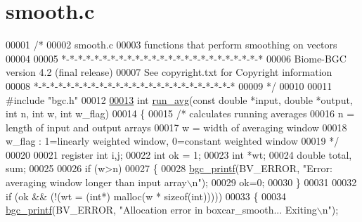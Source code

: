 \hypertarget{smooth_8c_source}{}\section{smooth.\+c}
\label{smooth_8c_source}

\begin{DoxyCode}
00001 \textcolor{comment}{/* }
00002 \textcolor{comment}{smooth.c}
00003 \textcolor{comment}{functions that perform smoothing on vectors}
00004 \textcolor{comment}{}
00005 \textcolor{comment}{*-*-*-*-*-*-*-*-*-*-*-*-*-*-*-*-*-*-*-*-*-*-*-*-*}
00006 \textcolor{comment}{Biome-BGC version 4.2 (final release)}
00007 \textcolor{comment}{See copyright.txt for Copyright information}
00008 \textcolor{comment}{*-*-*-*-*-*-*-*-*-*-*-*-*-*-*-*-*-*-*-*-*-*-*-*-*}
00009 \textcolor{comment}{*/}
00010 
00011 \textcolor{preprocessor}{#include "bgc.h"}
00012 
\hypertarget{smooth_8c_source_l00013}{}\hyperlink{smooth_8c_aff23c6bbf7cc127320af48545ed13432}{00013} \textcolor{keywordtype}{int} \hyperlink{smooth_8c_aff23c6bbf7cc127320af48545ed13432}{run\_avg}(\textcolor{keyword}{const} \textcolor{keywordtype}{double} *input, \textcolor{keywordtype}{double} *output, \textcolor{keywordtype}{int} n, \textcolor{keywordtype}{int} w, \textcolor{keywordtype}{int} w\_flag)
00014 \{
00015     \textcolor{comment}{/* calculates running averages}
00016 \textcolor{comment}{    n = length of input and output arrays}
00017 \textcolor{comment}{    w = width of averaging window}
00018 \textcolor{comment}{    w\_flag : 1=linearly weighted window, 0=constant weighted window}
00019 \textcolor{comment}{    */}
00020 
00021     \textcolor{keyword}{register} \textcolor{keywordtype}{int} i,j;
00022     \textcolor{keywordtype}{int} ok = 1;
00023     \textcolor{keywordtype}{int} *wt;
00024     \textcolor{keywordtype}{double} total, sum;
00025 
00026     \textcolor{keywordflow}{if} (w>n)
00027     \{
00028         \hyperlink{bgc__io_8c_af287cce6e2aede1ce337de9319e80d0d}{bgc\_printf}(BV\_ERROR, \textcolor{stringliteral}{"Error: averaging window longer than input array\(\backslash\)n"});
00029         ok=0;
00030     \}
00031 
00032     \textcolor{keywordflow}{if} (ok && (!(wt = (\textcolor{keywordtype}{int}*) malloc(w * \textcolor{keyword}{sizeof}(\textcolor{keywordtype}{int})))))
00033     \{
00034         \hyperlink{bgc__io_8c_af287cce6e2aede1ce337de9319e80d0d}{bgc\_printf}(BV\_ERROR, \textcolor{stringliteral}{"Allocation error in boxcar\_smooth... Exiting\(\backslash\)n"});

\end{DoxyCode}
